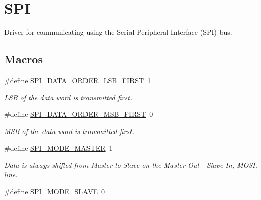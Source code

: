 \hypertarget{group__spi}{\section{S\-P\-I}
\label{group__spi}
}


Driver for communicating using the Serial Peripheral Interface (S\-P\-I) bus.  


\subsection*{Macros}
\begin{DoxyCompactItemize}
\item 
\hypertarget{group__spi_ga28bc36b326e2cb697ffb6d0ddd3c6263}{\#define \hyperlink{group__spi_ga28bc36b326e2cb697ffb6d0ddd3c6263}{S\-P\-I\-\_\-\-D\-A\-T\-A\-\_\-\-O\-R\-D\-E\-R\-\_\-\-L\-S\-B\-\_\-\-F\-I\-R\-S\-T}~1}\label{group__spi_ga28bc36b326e2cb697ffb6d0ddd3c6263}

\begin{DoxyCompactList}\small\item\em L\-S\-B of the data word is transmitted first. \end{DoxyCompactList}\item 
\hypertarget{group__spi_ga654a276f377599a8cf352b984843d39c}{\#define \hyperlink{group__spi_ga654a276f377599a8cf352b984843d39c}{S\-P\-I\-\_\-\-D\-A\-T\-A\-\_\-\-O\-R\-D\-E\-R\-\_\-\-M\-S\-B\-\_\-\-F\-I\-R\-S\-T}~0}\label{group__spi_ga654a276f377599a8cf352b984843d39c}

\begin{DoxyCompactList}\small\item\em M\-S\-B of the data word is transmitted first. \end{DoxyCompactList}\item 
\hypertarget{group__spi_gaa335c2abdfad9e6f6c2677719d93b64e}{\#define \hyperlink{group__spi_gaa335c2abdfad9e6f6c2677719d93b64e}{S\-P\-I\-\_\-\-M\-O\-D\-E\-\_\-\-M\-A\-S\-T\-E\-R}~1}\label{group__spi_gaa335c2abdfad9e6f6c2677719d93b64e}

\begin{DoxyCompactList}\small\item\em Data is always shifted from Master to Slave on the Master Out -\/ Slave In, M\-O\-S\-I, line. \end{DoxyCompactList}\item 
\hypertarget{group__spi_ga75f094fee5a9dc10b88401ccd17925d3}{\#define \hyperlink{group__spi_ga75f094fee5a9dc10b88401ccd17925d3}{S\-P\-I\-\_\-\-M\-O\-D\-E\-\_\-\-S\-L\-A\-V\-E}~0}\label{group__spi_ga75f094fee5a9dc10b88401ccd17925d3}


\end{DoxyCompactItemize}
